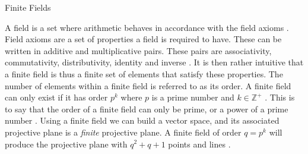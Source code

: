 \documentclass[final]{beamer}
\newenvironment{code}{\verb|}
\newcommand{\ind}{\phantom{aaa}}
\newlength{\colwidth}
\begin{document}
\begin{frame}[t]
\begin{columns}[t]
\begin{column}{\colwidth}

  \begin{block}{Finite Fields}

      A field is a set where arithmetic behaves in accordance with the field axioms \cite{Weisstein2023b}. Field axioms are a set of properties a field is required to have. These can be written in additive and multiplicative pairs. These pairs are associativity, commutativity, distributivity, identity and inverse \cite{Weisstein2023}. It is then rather intuitive that a finite field is thus a finite set of elements that satisfy these properties. The number of elements within a finite field is referred to as its order. A finite field can only exist if it has order $p^k$ where $p$ is a prime number and $k\in\mathbb{Z}^+$ \cite{cameron2000}. This is to say that the order of a finite field can only be prime, or a power of a prime number \cite{cameron2000}. Using a finite field we can build a vector space, and its associated projective plane is a \emph{finite} projective plane. A finite field of order $q=p^k$ will produce the projective plane with $q^2+q+1$ points and lines \cite{Collingridge2018}.


\end{block}
\end{column}
\end{columns}
\end{frame}
\end{document}
